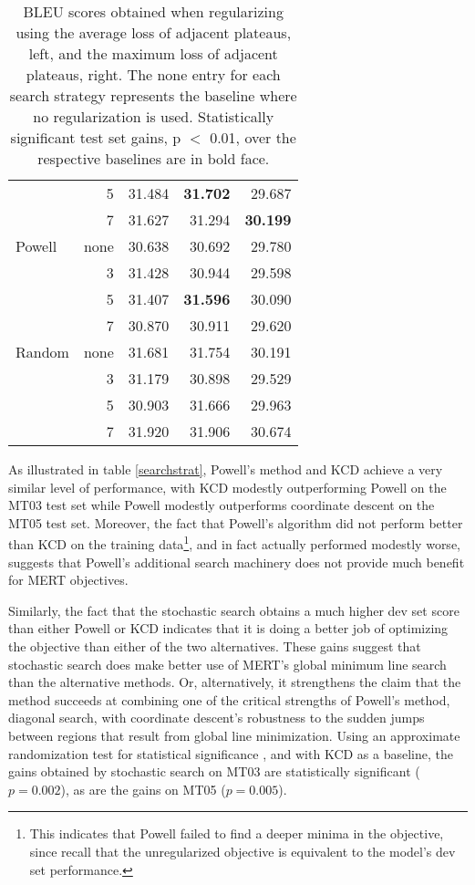\documentclass[11pt,tightenlines,kern-1pt]{article}
\begin{document}
\begin{table*}[htb!]
\begin{tabular}{|l|rrrr|}
           & 5  & 31.484   & {\bf 31.702}  &  29.687  \\
           & 7  & 31.627 &  31.294 & {\bf 30.199} \\ \hline
Powell     & none & 30.638 & 30.692 & 29.780 \\
           & 3  & 31.428  & 30.944  & 29.598 \\
           & 5  & 31.407  & {\bf 31.596} & 30.090  \\
           & 7  & 30.870  & 30.911 & 29.620  \\ \hline
Random     & none & 31.681 & 31.754 & 30.191 \\
           & 3  & 31.179 & 30.898 & 29.529 \\
           & 5  & 30.903 & 31.666 & 29.963 \\
           & 7  & 31.920 & 31.906 & 30.674 \\
\hline
\end{tabular}
\caption{
\label{avgminsmoothing}
BLEU scores obtained when regularizing using the average loss of adjacent plateaus, left, and the maximum loss of adjacent plateaus, right. The none entry for each search strategy represents the baseline where no regularization is used. Statistically significant test set gains, p \mbox{$<$} 0.01, over the respective baselines are in bold face. 
}
\end{table*}

As illustrated in table \ref{searchstrat}, Powell's method and KCD achieve a very similar level of performance, with KCD modestly outperforming Powell on the MT03 test set while Powell modestly outperforms coordinate descent on the MT05 test set. Moreover, the fact that Powell's algorithm did not perform better than KCD on the training data\footnote{This indicates that Powell failed to find a deeper minima in the objective, since recall that the unregularized objective is equivalent to the model's dev set performance.}, and in fact actually performed modestly worse, suggests that Powell's additional search machinery does not provide much benefit for MERT objectives. 

Similarly, the fact that the stochastic search obtains a much higher dev set score than either Powell or KCD indicates that it is doing a better job of optimizing the objective than either of the two alternatives. These gains suggest that stochastic search does make better use of MERT's global minimum line search than the alternative methods. Or, alternatively, it strengthens the claim that the method succeeds at combining one of the critical strengths of Powell's method, diagonal search, with coordinate descent's robustness to the sudden jumps between regions that result from global line minimization. Using an approximate randomization test for statistical significance \cite{fk2005}, and with KCD as a baseline, the gains obtained by stochastic search on MT03 are statistically significant (\mbox{$p = 0.002$}), as are the gains on MT05 (\mbox{$p=0.005$}). 
\end{document}

